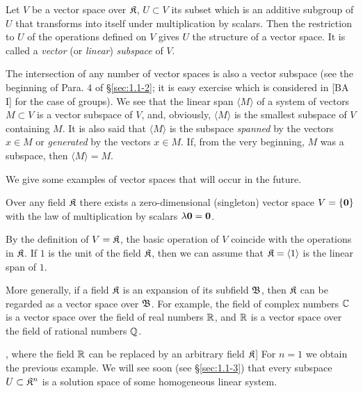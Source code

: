 \begin{definition}
	Let $V$ be a vector space over ${\mathfrak{K}}$, $U\subset V$ its subset which is an additive subgroup of $U$ that transforms into itself under multiplication by scalars. Then the restriction to $U$ of the operations defined on $V$ gives $U$ the structure of a vector space. It is called a \textit{vector} (or \textit{linear}) \textit{subspace} of $V$.
\end{definition}

The intersection of any number of vector spaces is also a vector subspace (see the beginning of Para. 4 of \S\ref{sec:1.1-2}; it is easy exercise which is considered in [BA I] for the case of groups). We see that the linear span $\langle M\rangle$ of a system of vectors $M\subset V$ is a vector subspace of $V$, and, obviously, $\langle M\rangle$ is the smallest subspace of $V$ containing $M$. It is also said that $\langle M\rangle$ is the subspace \textit{spanned} by the vectors $x\in M$ or \textit{generated} by the vectors $x\in M$. If, from the very beginning, $M$ was a subspace, then $\langle M\rangle = M$.

We give some examples of vector spaces that will occur in the future.

\begin{example}
	Over any field ${\mathfrak{K}}$ there exists a zero-dimensional (singleton) vector space $V = \{\v0\}$ with the law of multiplication by scalars $\lambda \v0 = \v0$.
\end{example}

\begin{example}
	By the definition of $V={\mathfrak{K}}$, the basic operation of $V$ coincide with the operations in ${\mathfrak{K}}$. If $1$ is the unit of the field ${\mathfrak{K}}$, then we can assume that ${\mathfrak{K}} = \langle 1\rangle$ is the linear span of $1$.
	
	More generally, if a field ${\mathfrak{K}}$ is an expansion of its subfield ${\mathfrak{B}}$, then ${\mathfrak{K}}$ can be regarded as a vector space over ${\mathfrak{B}}$. For example, the field of complex numbers ${\mathbb{C}}$ is a vector space over the field of real numbers ${\mathbb{R}}$, and ${\mathbb{R}}$ is a vector space over the field of rational numbers ${\mathbb{Q}}$.
\end{example}

\begin{example}[the $n$-dimensional coordinate space ${\fK}^n$; see [BA I, Ch. 2], where the field ${\mathbb{R}}$ can be replaced by an arbitrary field ${\mathfrak{K}}$]
	For $n = 1$ we obtain the previous example. We will see soon (see \S\ref{sec:1.1-3}) that every subspace $U\subset {{\mathfrak{K}}}^n$ is a solution space of some homogeneous linear system.
\end{example}

